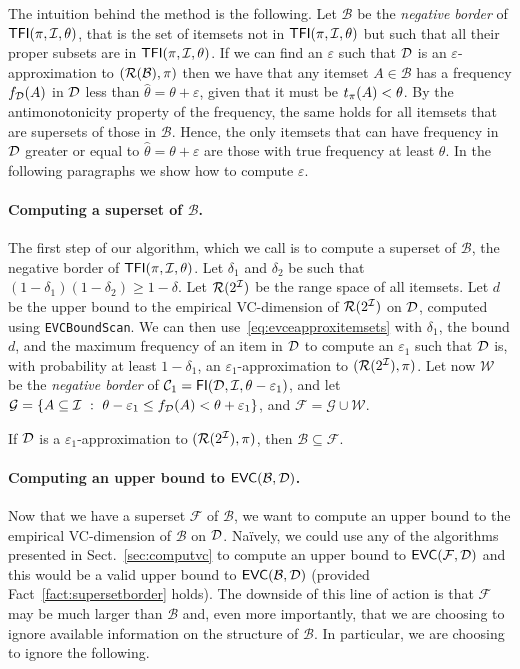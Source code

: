 The intuition behind the method is the following. Let $\mathcal{B}$ be the
\emph{negative border} of $\mathsf{TFI}(\pi,{\cal I},\theta)$, that is the set of itemsets
not in $\mathsf{TFI}(\pi,{\cal I},\theta)$ but such that all their proper subsets are in
$\mathsf{TFI}(\pi,{\cal I},\theta)$. If we can find an $\varepsilon$ such that ${\cal D}$ is an
$\varepsilon$-approximation to $(\mathcal{R}(\mathcal{B}),\pi)$ then we have that any
itemset $A\in\mathcal{B}$ has a frequency $f_{\cal D}(A)$ in ${\cal D}$ less than
$\hat{\theta}=\theta+\varepsilon$, given that it must be $t_\pi(A)<\theta$. By
the antimonotonicity property of the frequency, the same holds for all itemsets
that are supersets of those in $\mathcal{B}$. Hence, the only itemsets that can
have frequency in ${\cal D}$ greater or equal to $\hat{\theta}=\theta+\varepsilon$
are those with true frequency at least $\theta$. In the following paragraphs we
show how to compute $\varepsilon$.

\paragraph{Computing a superset of $\mathcal{B}$.} The first step of our
algorithm, which we call \ALG is to compute a superset of $\mathcal{B}$, the
negative border of $\mathsf{TFI}(\pi,{\cal I},\theta)$. Let $\delta_1$ and $\delta_2$ be
such that $(1-\delta_1)(1-\delta_2)\ge 1-\delta$. Let $\mathcal{R}(2^{\cal I})$ be the
range space of all itemsets. Let $d$ be the upper bound to the empirical
VC-dimension of $\mathcal{R}(2^{\cal I})$ on ${\cal D}$, computed using
\texttt{EVCBoundScan}. We can then use~\eqref{eq:evceapproxitemsets} with
$\delta_1$, the bound $d$, and the maximum frequency of an item in ${\cal D}$ to
compute an $\varepsilon_1$ such that ${\cal D}$ is, with probability at least
$1-\delta_1$, an $\varepsilon_1$-approximation to $(\mathcal{R}(2^{\cal I}),\pi)$. Let
now $\mathcal{W}$ be the \emph{negative border} of
$\mathcal{C}_1=\mathsf{FI}({\cal D},{\cal I},\theta-\varepsilon_1)$, and let
$\mathcal{G}=\{A\subseteq{\cal I} ~:~ \theta-\varepsilon_1\le
f_{\cal D}(A)<\theta+\varepsilon_1\}$, and $\mathcal{F}=\mathcal{G}\cup\mathcal{W}$.

\begin{fact}\label{fact:supersetborder}
	If ${\cal D}$ is a $\varepsilon_1$-approximation to $(\mathcal{R}(2^{\cal I}),\pi)$,
	then $\mathcal{B}\subseteq\mathcal{F}$.
\end{fact}

\paragraph{Computing an upper bound to $\mathsf{EVC}(\mathcal{B},{\cal D})$.} Now that we
have a superset $\mathcal{F}$ of $\mathcal{B}$, we want to compute an upper
bound to the empirical VC-dimension of $\mathcal{B}$ on ${\cal D}$. Na\"ively, we
could use any of the algorithms presented in Sect.~\ref{sec:computvc} to compute
an upper bound to $\mathsf{EVC}(\mathcal{F},{\cal D})$ and this would be a valid upper bound
to $\mathsf{EVC}(\mathcal{B},{\cal D})$ (provided Fact~\ref{fact:supersetborder} holds). The
downside of this line of action is that $\mathcal{F}$ may be much larger than
$\mathcal{B}$ and, even more importantly, that we are choosing to ignore
available information on the structure of $\mathcal{B}$. In particular, we are
choosing to ignore the following.

